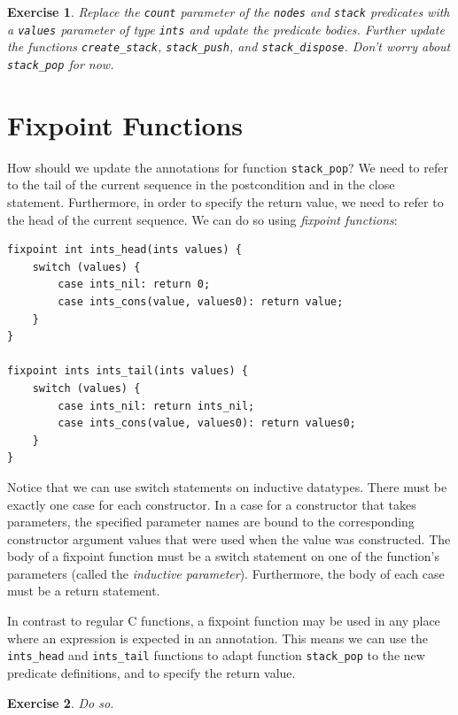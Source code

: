 \documentclass{article}
\newtheorem{exercise}{Exercise}
\begin{document}
\begin{exercise}\label{exercise:values}
Replace the \lstinline!count! parameter of the
\lstinline!nodes! and \lstinline!stack! predicates with a
\lstinline!values! parameter of type \lstinline!ints! and
update the predicate bodies. Further update the functions
\lstinline!create_stack!, \lstinline!stack_push!, and
\lstinline!stack_dispose!. Don't worry about \lstinline!stack_pop! for now.
\end{exercise}

\section{Fixpoint Functions}

How should we update the annotations for function
\lstinline!stack_pop!? We need to refer to the tail of the
current sequence in the postcondition and in the close
statement. Furthermore, in order to specify the return value,
we need to refer to the head of the current sequence. We can do
so using \emph{fixpoint functions}:
\begin{lstlisting}
fixpoint int ints_head(ints values) {
    switch (values) {
        case ints_nil: return 0;
        case ints_cons(value, values0): return value;
    }
}

fixpoint ints ints_tail(ints values) {
    switch (values) {
        case ints_nil: return ints_nil;
        case ints_cons(value, values0): return values0;
    }
}
\end{lstlisting}
Notice that we can use switch statements on inductive
datatypes. There must be exactly one case for each constructor.
In a case for a constructor that takes parameters, the
specified parameter names are bound to the corresponding
constructor argument values that were used when the value was
constructed. The body of a fixpoint function must be a switch
statement on one of the function's parameters (called the
\emph{inductive parameter}). Furthermore, the body of each case
must be a return statement.

In contrast to regular C functions, a fixpoint function may be
used in any place where an expression is expected in an
annotation. This means we can use the \lstinline!ints_head! and
\lstinline!ints_tail! functions to adapt function
\lstinline!stack_pop! to the new predicate definitions, and to
specify the return value.

\begin{exercise}\label{exercise:fixpoints}
Do so.
\end{exercise}
\end{document}
